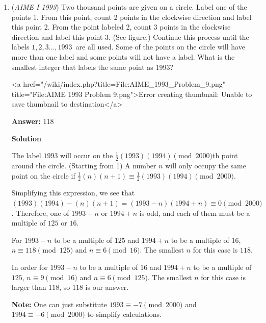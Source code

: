 \begin{enumerate}
 For computing $4\rightarrow4\mid5\mid6,$ we use the same process as before. We have $\binom{6}{4}\cdot(3+4+1)$ (Note, the $3$ comes from $\frac{\binom{4}{2}}{2}$), and for $5\rightarrow5\mid6$ we have $\binom{6}{5}\cdot\left(\frac{5}{2}+1\right),$ and then for $6\rightarrow6$ we just have $\binom{6}{6}$ (there is no double counted case since ABCDEF, ABCDEF is only counted once).

 Summing case by case, we have $1+12+60+150+120+21+1 = \boxed{365}.$



	\item (\textit{AIME I 1993}) Two thousand points are given on a circle. Label one of the points 1. From this point, count 2 points in the clockwise direction and label this point 2. From the point labeled 2, count 3 points in the clockwise direction and label this point 3. (See figure.) Continue this process until the labels $1,2,3\dots,1993\,$ are all used. Some of the points on the circle will have more than one label and some points will not have a label. What is the smallest integer that labels the same point as 1993? 


 <a href="/wiki/index.php?title=File:AIME\_1993\_Problem\_9.png" title="File:AIME 1993 Problem 9.png">Error creating thumbnail: Unable to save thumbnail to destination</a>

 \textbf{Answer: }118



\textbf{Solution}

The label $1993$ will occur on the $\frac12(1993)(1994) \pmod{2000}$th point around the circle. (Starting from 1) A number $n$ will only occupy the same point on the circle if $\frac12(n)(n + 1)\equiv \frac12(1993)(1994) \pmod{2000}$. 

 Simplifying this expression, we see that $(1993)(1994) - (n)(n + 1) = (1993 - n)(1994 + n)\equiv 0\pmod{2000}$. Therefore, one of $1993 - n$ or $1994 + n$ is odd, and each of them must be a multiple of $125$ or $16$. 

 For $1993 - n$ to be a multiple of $125$ and $1994 + n$ to be a multiple of $16$, $n \equiv 118 \pmod {125}$ and $n\equiv 6 \pmod {16}$. The smallest $n$ for this case is $118$. 

 In order for $1993 - n$ to be a multiple of $16$ and $1994 + n$ to be a multiple of $125$, $n\equiv 9\pmod{16}$ and $n\equiv 6\pmod{125}$. The smallest $n$ for this case is larger than $118$, so $\boxed{118}$ is our answer.

 \textbf{Note:} One can just substitute $1993\equiv-7\pmod{2000}$ and $1994\equiv-6\pmod{2000}$ to simplify calculations.


\end{enumerate}
